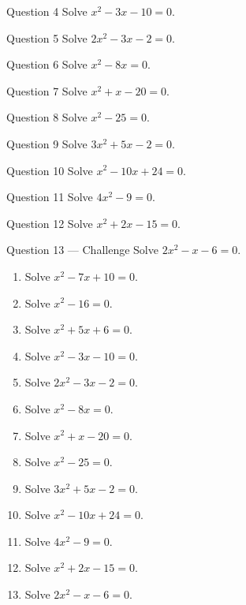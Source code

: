\documentclass[11pt]{article}
\begin{document}
\begin{qbox}{Question 4}
Solve $x^2-3x-10=0$.\workspace{2.4cm}
\end{qbox}

\begin{qbox}{Question 5}
Solve $2x^2-3x-2=0$.\workspace{2.4cm}
\end{qbox}

\begin{qbox}{Question 6}
Solve $x^2-8x=0$.\workspace{2.4cm}
\end{qbox}

\begin{qbox}{Question 7}
Solve $x^2+x-20=0$.\workspace{2.4cm}
\end{qbox}

\begin{qbox}{Question 8}
Solve $x^2-25=0$.\workspace{2.4cm}
\end{qbox}

\begin{qbox}{Question 9}
Solve $3x^2+5x-2=0$.\workspace{2.4cm}
\end{qbox}

\begin{qbox}{Question 10}
Solve $x^2-10x+24=0$.\workspace{2.4cm}
\end{qbox}

\begin{qbox}{Question 11}
Solve $4x^2-9=0$.\workspace{2.4cm}
\end{qbox}

\begin{qbox}{Question 12}
Solve $x^2+2x-15=0$.\workspace{2.4cm}
\end{qbox}

\begin{qbox}{Question 13 --- Challenge}
Solve $2x^2-x-6=0$.\workspace{3cm}
\end{qbox}

\clearpage
{}

\begin{recapbox}
\begin{multicols}{2}
\small
\begin{enumerate}[leftmargin=*,itemsep=3pt]
  \item Solve $x^2-7x+10=0$.
  \item Solve $x^2-16=0$.
  \item Solve $x^2+5x+6=0$.
  \item Solve $x^2-3x-10=0$.
  \item Solve $2x^2-3x-2=0$.
  \item Solve $x^2-8x=0$.
  \item Solve $x^2+x-20=0$.
  \item Solve $x^2-25=0$.
  \item Solve $3x^2+5x-2=0$.
  \item Solve $x^2-10x+24=0$.
  \item Solve $4x^2-9=0$.
  \item Solve $x^2+2x-15=0$.
  \item Solve $2x^2-x-6=0$.
\end{enumerate}
\end{multicols}
\end{recapbox}
\end{document}
